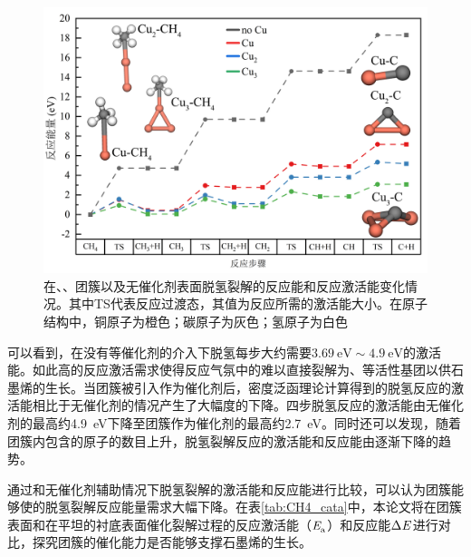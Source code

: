     \begin{figure}[htb]
        \includegraphics{pic/CG_DFT_CuCHx.png}
        \caption{在、、团簇以及无催化剂表面脱氢裂解的反应能和反应激活能变化情况。其中TS代表反应过渡态，其值为反应所需的激活能大小。在原子结构中，铜原子为橙色；碳原子为灰色；氢原子为白色}
        \label{fig:CG_DFT_CuCHx}
    \end{figure}

    可以看到，在没有等催化剂的介入下脱氢每步大约需要$\SI{3.69}{\electronvolt}\sim  \SI{4.9}{\electronvolt}$的激活能。如此高的反应激活需求使得反应气氛中的难以直接裂解为、等活性基团以供石墨烯的生长。当团簇被引入作为催化剂后，密度泛函理论计算得到的脱氢反应的激活能相比于无催化剂的情况产生了大幅度的下降。四步脱氢反应的激活能由无催化剂的最高约\SI{4.9}{\electronvolt}下降至团簇作为催化剂的最高约\SI{2.7}{\electronvolt}。同时还可以发现，随着团簇内包含的原子的数目上升，脱氢裂解反应的激活能和反应能由逐渐下降的趋势。

    通过和无催化剂辅助情况下脱氢裂解的激活能和反应能进行比较，可以认为团簇能够使的脱氢裂解反应能量需求大幅下降。在表\ref{tab:CH4_cata}中，本论文将在团簇表面和在平坦的衬底表面催化裂解过程的反应激活能（$\it E_{\rm a}^{\rm } \it$）和反应能$\rm{\Delta} \it \it E_{\rm }^{\rm } \it$进行对比，探究团簇的催化能力是否能够支撑石墨烯的生长。

    

